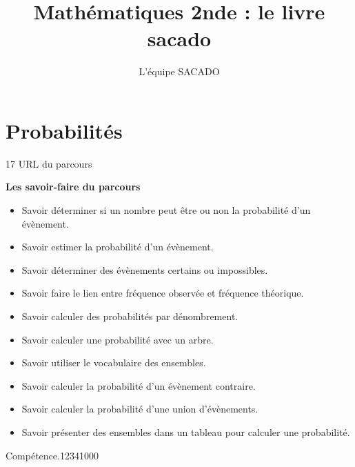 



\title{Mathématiques 2nde  : le livre sacado}
\author{L'équipe SACADO}




\chapter{Probabilités}{17}
{URL du parcours}
{
 \begin{CpsCol}
	\textbf{Les savoir-faire du parcours}
 	\begin{itemize}
 		\item Savoir déterminer si un nombre peut être ou non la probabilité d'un évènement. 
		\item Savoir estimer la probabilité d'un évènement. 
		\item Savoir déterminer des évènements certains ou impossibles. 
		\item Savoir faire le lien entre fréquence observée et fréquence théorique. 
		\item Savoir calculer des probabilités par dénombrement. 
		\item Savoir calculer une probabilité avec un arbre.  
		\item Savoir utiliser le vocabulaire des ensembles.
		\item Savoir calculer la probabilité d'un évènement contraire.
		\item Savoir calculer la probabilité d'une union d'évènements.
		\item Savoir présenter des ensembles dans un tableau pour calculer une probabilité.
 	\end{itemize}
 \end{CpsCol}

\begin{His}
\end{His}

\begin{ExoDec}{Compétence.}{1234}{1}{0}{0}{0}
\end{ExoDec}
}


